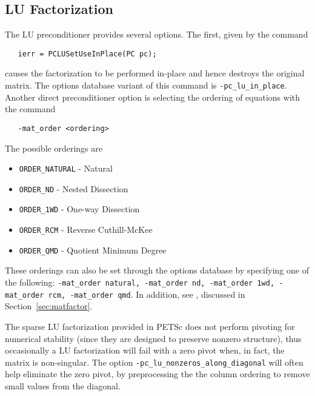 
\subsection{LU Factorization}

The LU preconditioner provides several options.  The first, given by
the 
command  
\begin{verbatim}
   ierr = PCLUSetUseInPlace(PC pc);
\end{verbatim}
causes the factorization to be performed in-place and hence
destroys the original matrix.  The options database variant of
this command is {\tt -pc\_lu\_in\_place}. 
Another direct preconditioner option is selecting the ordering
of equations with the command  
\begin{verbatim}
   -mat_order <ordering>
\end{verbatim}
The possible orderings are
\begin{itemize}
\item {\tt ORDER\_NATURAL} - Natural
\item {\tt ORDER\_ND} - Nested Dissection
\item {\tt ORDER\_1WD} - One-way Dissection
\item {\tt ORDER\_RCM} - Reverse Cuthill-McKee
\item {\tt ORDER\_QMD} - Quotient Minimum Degree
\end{itemize}
  
  
  
 
These orderings can also be set through the options database by specifying 
one of the following:  {\tt -mat\_order natural, -mat\_order nd, 
-mat\_order 1wd, -mat\_order rcm, -mat\_order qmd}.
In addition, see 
, discussed in Section~\ref{sec:matfactor}.

The sparse LU factorization provided in PETSc does not perform pivoting for 
numerical stability (since they are designed to preserve nonzero 
structure), thus occasionally a LU factorization will fail with a zero 
pivot when, in fact, the matrix is non-singular. The option
{\tt -pc\_lu\_nonzeros\_along\_diagonal} 
will often help eliminate the zero pivot, by preprocessing the the 
column ordering to remove small values from the diagonal.


